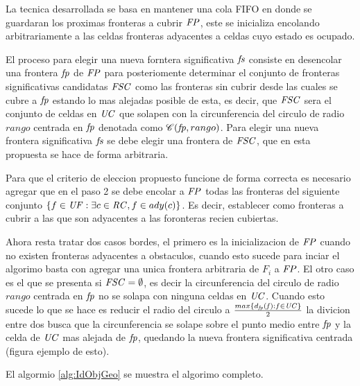 La tecnica desarrollada se basa en mantener una cola FIFO en donde se guardaran
los proximas fronteras a cubrir $\mathit{FP}$, este se inicializa encolando
arbitrariamente a las celdas fronteras adyacentes a celdas cuyo estado es
ocupado. 

El proceso para elegir una nueva forntera significativa $\mathit{fs}$ consiste en
desencolar una frontera $\mathit{fp}$ de $\mathit{FP}$ para posteriomente determinar
el conjunto de fronteras significativas candidatas $\mathit{FSC}$ como las
fronteras sin cubrir desde las cuales se cubre a $\mathit{fp}$ estando lo mas
alejadas posible de esta, es decir, que $\mathit{FSC}$ %
sera el conjunto de celdas en $\mathit{UC}$ que solapen con la circunferencia del
circulo de radio $rango$ centrada en $\mathit{fp}$ denotada como $\mathscr{C}(\mathit{fp},rango)$.
Para elegir una nueva frontera significativa $\mathit{fs}$ se debe elegir una
frontera de $\mathit{FSC}$, que en esta propuesta se hace de forma arbitraria.

Para que el criterio de eleccion propuesto funcione de forma correcta es
necesario agregar que en el paso 2 se debe encolar a $\mathit{FP}$ todas las
fronteras del siguiente conjunto $\{ f \in \mathit{UF} : \exists c \in \mathit{RC}, f
\in ady(c)\}$. Es decir, establecer como fronteras a cubrir a las que son
adyacentes a las foronteras recien cubiertas.

Ahora resta tratar dos casos bordes, el primero es la inicializacion de
$\mathit{FP}$ cuando no existen fronteras adyacentes a obstaculos, cuando esto
sucede para inciar el algorimo basta con agregar una unica frontera arbitraria
de $F_i$ a $\mathit{FP}$. El otro caso es el que se presenta si $\mathit{FSC} = \emptyset$, es
decir la circunferencia del circulo de radio $rango$ centrada en $\mathit{fp}$ no
se solapa con ninguna celdas en $\mathit{UC}$. Cuando esto sucede lo que se hace
es reducir el radio del circulo a $\frac{max\{ d_{\mathit{fp}}(\mathit{f}) :
f\in\mathit{UC} \}}{2}$ la divicion entre dos busca que la circunferencia se
solape sobre el punto medio entre $\mathit{fp}$  y la celda de $\mathit{UC}$ mas
alejada de $\mathit{fp}$, quedando la nueva frontera significativa centrada
(figura ejemplo de esto).

El algormio  \ref{alg:IdObjGeo} se muestra el algorimo completo.

